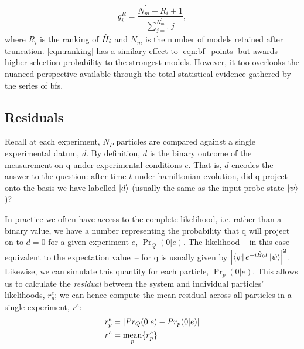 \begin{equation}
    \label{eqn:ranking}
    g_i^R = \frac{N_m^{\prime}-R_i+1}{\sum\limits_{j=1}^{N^{\prime}_m} j},
\end{equation}
    where $R_i$ is the ranking of $\hat{H}_i$ and $N_m^{\prime}$ is the number of models retained after truncation. 
\cref{eqn:ranking} has a similary effect to \cref{eqn:bf_points} but awards higher selection probability to 
    the strongest models. 
However, it too overlooks the nuanced perspective available through the total statistical evidence gathered by the series of \glspl{bf}. 

\subsection{Residuals}\label{sec:residuals}
Recall at each experiment, $N_P$ \glspl{particle} are compared against a single experimental datum, $d$. 
By definition, $d$ is the binary outcome of the measurement on \gls{q} under experimental conditions $e$.
That is, $d$ encodes the answer to the question: 
    after time $t$ under \gls{hamiltonian} evolution, did \gls{q} project onto 
    the basis we have labelled $\ket{d}$ (usually the same as the input \gls{probe} state $\ket{\psi}$)?
\par 
In practice we often have access to the complete \gls{likelihood}, 
    i.e. rather than a binary value, we have a number representing the probability that 
    \gls{q} will project on to $d=0$ for a given \gls{experiment} $e$, $\Pr_Q(0 | e)$. 
The \gls{likelihood} -- in this case equivalent to the \gls{expectation value}\footnotemark \ -- 
    for \gls{q} is usually given by $\left\lvert  \bra{\psi} e^{-i\hat{H}_0 t} \ket{\psi}  \right\rvert^2$.
Likewise, we can simulate this quantity for each particle, $\Pr_p(0 | e)$. 
This allows us to calculate the \emph{residual} between the system and individual \glspl{particle}' \glspl{likelihood}, $r_p^e$; 
    we can hence compute the mean residual across all \glspl{particle} in a single \gls{experiment}, $r^e$:
\begin{align}
    \label{eqn:particle_residual}
    \begin{split}
    r_p^e & = \left\lvert  Pr_Q(0 | e) - Pr_p(0 | e)  \right\rvert  \\
    r^e &= \underset{p}{\text{mean}} \{r_p^e\}
    \end{split}
\end{align}

\par 


